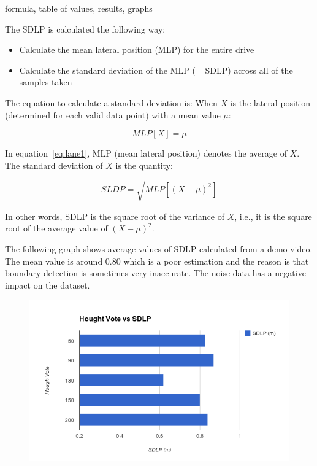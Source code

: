 formula, table of values, results, graphs

The SDLP is calculated the following way:

\begin{itemize}
    \item Calculate the mean lateral position (MLP) for the entire drive 
    \item Calculate the standard deviation of the MLP (= SDLP) across all of the samples taken
\end{itemize}

The equation to calculate a standard deviation is:
When $X$ is the lateral position (determined for each valid data point) with a
mean value $\mu$:

\begin{equation}
    MLP[X] = \mu
    \label{eq:lane1}
\end{equation}

In equation~\ref{eq:lane1}, MLP (mean lateral position) denotes the average of
$X$. The standard deviation of $X$ is the quantity:

\begin{equation}
    SLDP = \sqrt{MLP[(X - \mu)^2]}
\end{equation}

In other words, SDLP is the square root of the variance of $X$, i.e., it is the
square root of the average value of $(X - \mu)^2$.

The following graph shows average values of SDLP calculated from a demo video. The mean value is around 0.80 which is a poor estimation and the reason is that boundary detection is sometimes very inaccurate. The noise data has a negative impact on the dataset. 


\begin{figure}[H]
\begin{center}
    \includegraphics[scale=0.6]{img/lane11.png}
\end{center}
\label{fig:lane11}
\end{figure}

